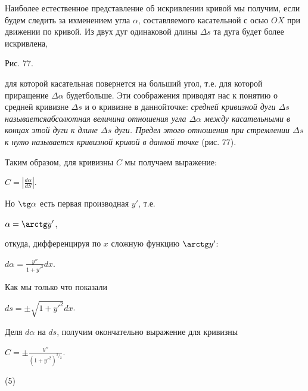 \documentclass[a5paper]{article}
\begin{document}
	Наиболее естественное представление об искривлении кривой мы получим, если будем следить за ихменением угла $\alpha$, составляемого касательной с осью $OX$ при движении по кривой. Из двух дуг оди\-наковой длины $\Delta s$ та дуга будет более искривлена,
	\begin{floatingfigure}{27mm}
	\captionsetup{labelformat=empty}
	\caption{Рис. 77.}
	\end{floatingfigure}
	\noindent
	для которой касательная повернется на больший угол, т.е. для которой приращение $\Delta\alpha$ будет\linebreak больше. Эти соображения приводят нас к понятию о средней кривизне $\Delta s$ и о кривизне в данной\linebreak точке: {\it средней кривизной дуги $\Delta s$ называется\linebreak абсолютная величина отношения угла $\Delta\alpha$ между касательными  в концах этой дуги к длине $\Delta s$ дуги. Предел этого отношения при стремлении $\Delta s$ к нулю называется кривизной кри\-вой в данной точке} (рис. 77).
	
	Таким образом, для кривизны $C$ мы получаем выражение:
	\begin{center}
		$C=|\frac{d\alpha}{dS}|$.
	\end{center}
	Но $\tg\alpha$ есть первая производная $y'$, т.е.
	\begin{center}
		$\alpha=\arctg y'$,
	\end{center}
	откуда, дифференцируя по $x$ сложную функцию $\arctg y'$:
	\begin{center}
		$d\alpha=\frac{y''}{1+y'^2}dx$.
	\end{center}

	Как мы только что показали
	\begin{center}
		$ds=\pm\sqrt{1+y'^2}dx$.
	\end{center}
	Деля $d\alpha$ на $ds$, получим окончательно выражение для кривизны
	\begin{center}
		$C=\pm\frac{y''}{(1+y'^2)^{^3\slash_2}}$.
	\end{center}
	\vspace{-0.67cm}
	\hspace{10.8cm} (5)
\end{document}
